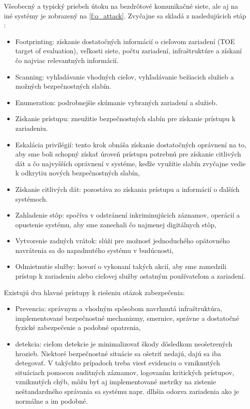 \documentclass[12pt,a4paper,oneside,openright]{report}
\begin{document}
Všeobecný a typický priebeh útoku na bezdrôtové komunikačné siete, ale aj na iné systémy je zobrazený na \ref{f:o_attack}. Zvyčajne sa skladá z nasledujúcich etáp \cite{bidgoli2006handbook}:

\singlespacing
\begin{itemize}
	\item Footprinting: získanie dostatočných informácií o cieľovom zariadení (TOE target of evaluation), veľkosti siete, počtu zariadení, infraštruktúre a získaní čo najviac relevantných informácií.
	\item Scanning: vyhľadávanie vhodných cieľov, vyhľadávanie bežiacich služieb a možných bezpečnostných slabín.
	\item Enumeration: podrobnejšie skúmanie vybraných zariadení a služieb.
	\item Získanie prístupu: zneužitie bezpečnostných slabín pre získanie prístupu k zariadeniu.
	\item Eskalácia privilégií: tento krok obnáša získanie dostatočných oprávnení na to, aby sme boli schopný získať úroveň prístupu potrebnú pre získanie citlivých dát a čo najvyšších oprávnení v systéme, keďže využitie slabín zvyčajne vedie k odkrytiu nových bezpečnostných slabín,
	\item Získanie citlivých dát: pozostáva zo získania prístupu a informácií o ďalších systémoch.
	\item Zahladenie stôp: spočíva v odstránení inkriminujúcich záznamov, operácií a opustenie systému, aby sme zanechali čo najmenej digitálnych stôp,
	\item Vytvorenie zadných vrátok: slúži pre možnosť jednoduchého opätovného navrátenia sa do napadnutého systému v budúcnosti,
	\item Odmietnutie služby: hovorí o vykonaní takých akcií, aby sme zamedzili prístup k zariadeniu alebo cieľovej služby ostatným používateľom a zariadení.
\end{itemize}

Existujú dva hlavné prístupy k riešeniu otázok zabezpečenia:
\singlespacing
\begin{itemize}
	\item Prevencia: správnym a vhodným spôsobom navrhnutá infraštruktúra, implementované bezpečnostné mechanizmy, smernice, správne a dostatočné fyzické zabezpečenie a podobné opatrenia,
	\item detekcia: cieľom detekcie je minimalizovať škody dôsledkom neošetrených hrozieb. Niektoré bezpečnostné situácie sa ošetriť nedajú, dajú sa iba detegovať. V takýchto prípadoch treba viesť evidenciu o vzniknutých situáciach pomocou auditných záznamov, logovaním kritických prístupov, vzniknutých chýb, môžu byť aj implementované metriky na zistenie neštandardného správania sa systému napr. dlhšia odozva zariadenia ako je normálne a im podobné.
\end{itemize}
\onehalfspacing
\end{document}
